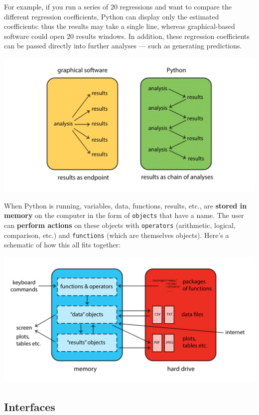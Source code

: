 \documentclass[
]{book}
\begin{document}
For example, if you run a series of 20 regressions and want to compare the
different regression coefficients, Python can display only the estimated coefficients:
thus the results may take a single line, whereas graphical-based software could
open 20 results windows. In addition, these regression coefficients can be passed
directly into further analyses --- such as generating predictions.

\includegraphics{Python/PythonIntro/images/python_chain.png}

When Python is running, variables, data, functions, results, etc., are \textbf{stored in memory}
on the computer in the form of \texttt{objects} that have a name. The user can
\textbf{perform actions} on these objects with \texttt{operators} (arithmetic, logical,
comparison, etc.) and \texttt{functions} (which are themselves objects). Here's a
schematic of how this all fits together:

\includegraphics{Python/PythonIntro/images/python_works.png}

\hypertarget{interfaces-1}{%
\subsection{Interfaces}\label{interfaces-1}}
\end{document}
